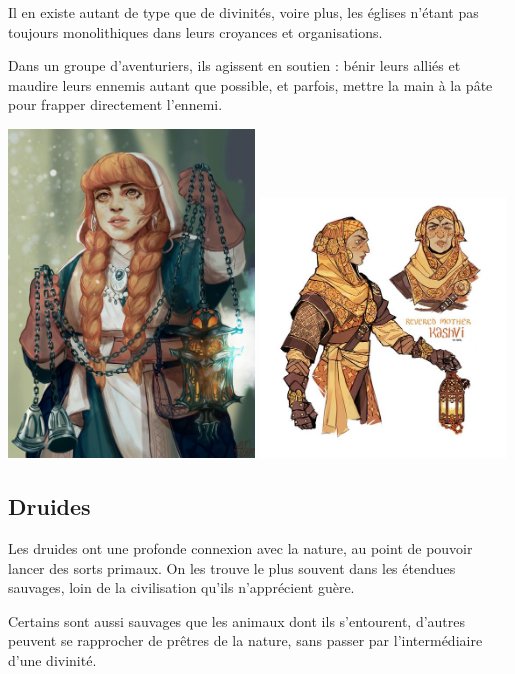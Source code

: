 \documentclass[10pt,a4paper]{book}
\begin{document}
Il en existe autant de type que de divinités, voire plus, les églises n'étant pas toujours monolithiques dans leurs croyances et organisations.

Dans un groupe d'aventuriers, ils agissent en soutien : bénir leurs alliés et maudire leurs ennemis autant que possible, et parfois, mettre la main à la pâte pour frapper directement l'ennemi.

\includegraphics[width=0.49\textwidth]{clerc 1}
\includegraphics[width=0.49\textwidth]{clerc 2}
\subsection{Druides}
Les druides ont une profonde connexion avec la nature, au point de pouvoir lancer des sorts primaux. On les trouve le plus souvent dans les étendues sauvages, loin de la civilisation qu'ils n'apprécient guère.

Certains sont aussi sauvages que les animaux dont ils s'entourent, d'autres peuvent se rapprocher de prêtres de la nature, sans passer par l'intermédiaire d'une divinité.
\end{document}
